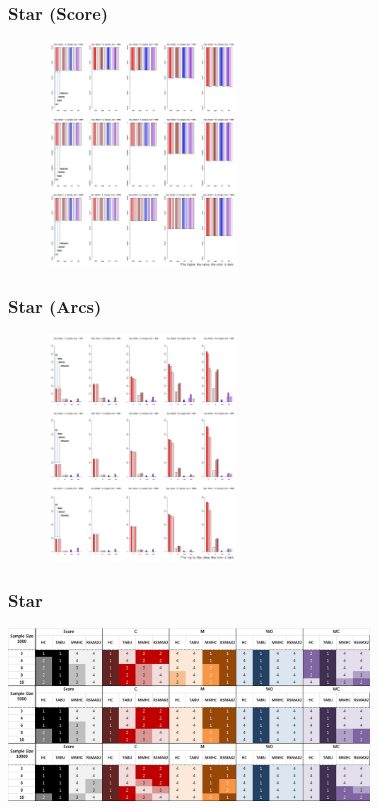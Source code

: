 \documentclass{beamer}
\begin{document}
\begin{frame}
\frametitle{Star (Score)}
{\scriptsize{}
	\begin{figure}
		\includegraphics[height=170pt]{images/03_Star_Score}
	\end{figure}	
}
\end{frame}


\begin{frame}
\frametitle{Star (Arcs)}
{\scriptsize{}
	\begin{figure}
		\includegraphics[height=170pt]{images/03_Star_Arcs}
	\end{figure}	
}
\end{frame}



\begin{frame}
\frametitle{Star}
{\scriptsize{}
	\begin{center}
		\includegraphics[height=130pt]{images/Result_Star}
	\end{center}
}
\end{frame}
\end{document}
